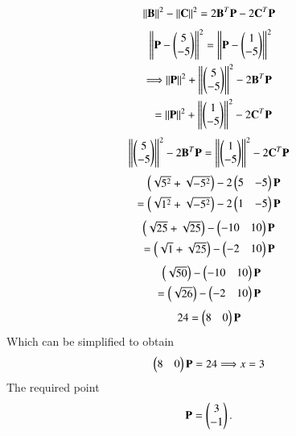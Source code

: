 \documentclass[journal,12pt,twocolumn]{IEEEtran}
\begin{document}
\begin{align}
    \norm{\vec{B}}^2 - \norm{\vec{C}}^2 =2\vec{B}^T\vec{P} -2\vec{C}^T\vec{P}
\end{align}
\begin{align}
    \norm{\vec{P}-\myvec{5\\-5}}^2 =\norm{\vec{P} - \myvec{1\\-5}}^2\\
    \Longrightarrow \norm{\vec{P}}^2 + \norm{\myvec{5\\-5}}^2 -2\vec{B}^T\vec{P}\\ = \norm{\vec{P}}^2 + \norm{\myvec{1\\-5}}^2 -2\vec{C}^T\vec{P}
\end{align}
\begin{align}
    \norm{\myvec{5\\-5}}^2 -2\vec{B}^T\vec{P} = \norm{\myvec{1\\-5}}^2 -2\vec{C}^T\vec{P}
\end{align}
\begin{align}
    \myvec{\sqrt{5^2}+\sqrt{-5^2}} -2\myvec{5&-5}\vec{P} \\= \myvec{\sqrt{1^2}+\sqrt{-5^2}} -2\myvec{1&-5}\vec{P}         
\end{align}
\begin{align}
    \myvec{\sqrt{25}+\sqrt{25}} -\myvec{-10&10}\vec{P} \\= \myvec{\sqrt{1}+\sqrt{25}} -\myvec{-2&10}\vec{P}
\end{align}
\begin{align}
    \myvec{\sqrt{50}} -\myvec{-10&10}\vec{P} \\= \myvec{\sqrt{26}} -\myvec{-2&10}\vec{P}
\end{align}
\begin{align}
    24 = \myvec{8&0}\vec{P}
\end{align}
Which can be simplified to obtain
\begin{align}
    \myvec{8&0}\vec{P} = 24
    \Longrightarrow x = 3
\end{align}
The required point 
\begin{align}
    \vec{P}=\myvec{3\\-1}.
\end{align}
\end{document}
